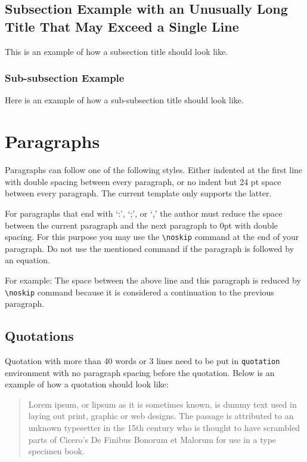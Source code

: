 \subsection{Subsection Example with an Unusually Long Title That May Exceed a Single Line}\label{subsec:subsectionexample}
This is an example of how a subsection title should look like.

\subsubsection{Sub-subsection Example}\label{subsubsec:subsubsectionexample}
Here is an example of how a sub-subsection title should look like.

\section{Paragraphs}\label{sec:paragraphs}
Paragraphs can follow one of the following styles. Either indented at the first line with double spacing between every paragraph, or no indent but 24 pt space between every paragraph. The current template only supports the latter.

For paragraphs that end with `:', `;', or `,' the author must reduce the space between the current paragraph and the next paragraph to 0pt with double spacing. For this purpose you may use the \texttt{\textbackslash{noskip}} command at the end of your paragraph. Do not use the mentioned command if the paragraph is followed by an equation.

For example:\noskip
The space between the above line and this paragraph is reduced by \texttt{\textbackslash{noskip}} command because it is considered a continuation to the previous paragraph.

\subsection{Quotations}\label{subsec:quotations}

Quotation with more than 40 words or 3 lines need to be put in \texttt{quotation} environment with no paragraph spacing before the quotation. Below is an example of how a quotation should look like:

\noskip
\begin{quotation}
    Lorem ipsum, or lipsum as it is sometimes known, is dummy text used in laying out print, graphic or web designs. The passage is attributed to an unknown typesetter in the 15th century who is thought to have scrambled parts of Cicero's De Finibus Bonorum et Malorum for use in a type specimen book.
\end{quotation}


